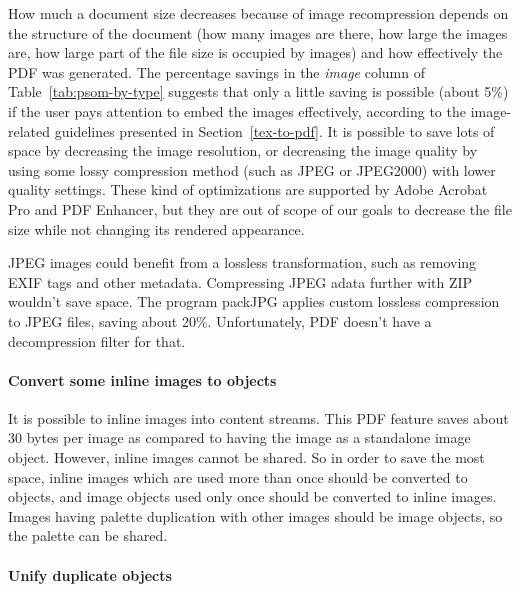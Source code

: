 \documentclass{ltugproc}
\begin{document}
How much a document size decreases because of image recompression depends on
the structure of the document (how many images are there, how large the
images are, how large part of the file size is occupied by images) and how
effectively the PDF was generated. The percentage savings in the
\emph{image} column of Table~\ref{tab:psom-by-type} suggests that only a little
saving is possible (about 5\%) if the user pays attention to embed the
images effectively, according to the image-related guidelines presented in
Section~\ref{tex-to-pdf}. It is possible to save lots of space by decreasing
the image resolution, or decreasing the image quality by using some lossy
compression method (such as JPEG or JPEG2000) with lower quality settings.
These kind of optimizations are supported by Adobe Acrobat Pro and PDF Enhancer,
but they are out of scope of our goals to decrease the file size while not
changing its rendered appearance.

JPEG images could benefit from a lossless transformation, such as removing
EXIF tags and other metadata. Compressing JPEG adata further with ZIP
wouldn't save space. The program packJPG \cite{packJPG} applies custom lossless
compression to JPEG files, saving about 20\%. Unfortunately, PDF doesn't
have a decompression filter for that.

\paragraph{Convert some inline images to objects}

It is possible to inline images into content streams. This PDF feature saves
about 30 bytes per image as compared to having the image as a standalone
image object. However, inline images cannot be shared. So in order to save
the most space, inline images which are used more than once should be
converted to objects, and image objects used only once should be converted
to inline images. Images having palette duplication with other images should
be image objects, so the palette can be shared.

\paragraph{Unify duplicate objects}
\end{document}
